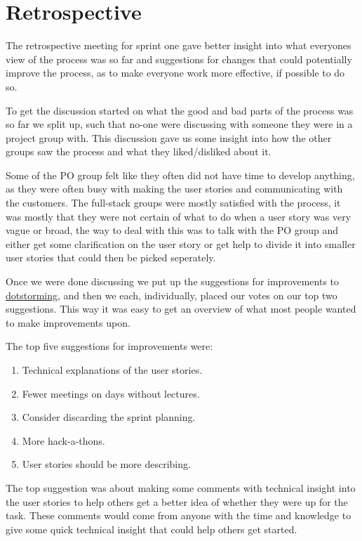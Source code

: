 \section{Retrospective}
The retrospective meeting for sprint one gave better insight into what everyones view of the process was so far and suggestions for changes that could potentially improve the process, as to make everyone work more effective, if possible to do so. 

To get the discussion started on what the good and bad parts of the process was so far we split up, such that no-one were discussing with someone they were in a project group with. 
This discussion gave us some insight into how the other groups saw the process and what they liked/disliked about it. 

Some of the PO group felt like they often did not have time to develop anything, as they were often busy with making the user stories and communicating with the customers. 
The full-stack groups were mostly satisfied with the process, it was mostly that they were not certain of what to do when a user story was very vague or broad, the way to deal with this was to talk with the PO group and either get some clarification on the user story or get help to divide it into smaller user stories that could then be picked seperately.

Once we were done discussing we put up the suggestions for improvements to \href{www.dotstorming.com}{dotstorming}, and then we each, individually, placed our votes on our top two suggestions.
This way it was easy to get an overview of what most people wanted to make improvements upon.

The top five suggestions for improvements were:
\begin{enumerate}
  \item Technical explanations of the user stories.
  \item Fewer meetings on days without lectures.
  \item Consider discarding the sprint planning.
  \item More hack-a-thons.
  \item User stories should be more describing.
\end{enumerate}

The top suggestion was about making some comments with technical insight into the user stories to help others get a better idea of whether they were up for the task.
These comments would come from anyone with the time and knowledge to give some quick technical insight that could help others get started. 

